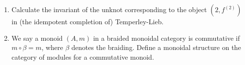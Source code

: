 \documentclass[12pt]{amsart}
\begin{document}
\begin{enumerate}
\newcommand{\twostrandid}{\begin{tikzpicture}[baseline=-0.5ex,rotate=90,scale=0.8]
	\draw (45:.8cm) to [curve through=(90:.3cm)] (135:.8cm);
	\draw (-45:.8cm) to [curve through=(-90:.3cm)] (-135:.8cm);
\end{tikzpicture}}

$$f^{(2)} = \twostrandid -\frac{1}{\delta} \cupcap
.$$
\item Calculate the invariant of the unknot corresponding to the object $(2,f^{(2)})$ in (the idempotent completion of) Temperley-Lieb.
\item We say a monoid $(A, m)$ in a braided monoidal category is commutative if $m \circ \beta = m$, where $\beta$ denotes the braiding. Define a monoidal structure on the category of modules for a commutative monoid.
\end{enumerate}


\end{document}
